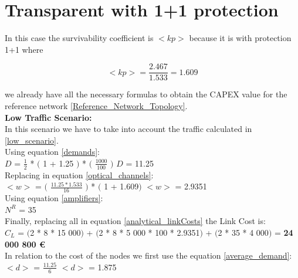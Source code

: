 \clearpage

\section{Transparent with 1+1 protection}\label{analytical_Transp_Protection}

In this case the survivability coefficient is $<kp>$ because it is with protection 1+1 where

\begin{equation*}
<kp> = \frac{2.467}{1.533} = 1.609
\end{equation*}

\noindent
we already have all the necessary formulas to obtain the CAPEX value for the reference network \ref{Reference_Network_Topology}.\\

\textbf{Low Traffic Scenario:}\\

In this scenario we have to take into account the traffic calculated in \ref{low_scenario}.\\

Using equation \ref{demands}:\\

$D$ = $\frac{1}{2}$ * $($ 1 + 1.25 $)$ * $($ $\frac{1000}{100}$ $)$ \qquad \qquad $D$ = 11.25\\

Replacing in equation \ref{optical_channels}:\\

$<w>$ = $($ $\frac{11.25 * 1.533}{16}$ $)$ * $($ 1 + 1.609$)$ \qquad \qquad $<w>$ = 2.9351\\

Using equation \ref{amplifiers}:\\

$N^R$ = 35\\

Finally, replacing all in equation \ref{analytical_linkCosts} the Link Cost is:\\

$C_L$ = $($2 * 8 * 15 000$)$ + $($2 * 8 * 5 000 * 100 * 2.9351$)$ + $($2 * 35 * 4 000$)$ = \textbf{24 000 800 \euro}\\

In relation to the cost of the nodes we first use the equation \ref{average_demand}:\\

$<d>$ = $\frac{11.25}{6}$ \qquad \qquad $<d>$ = 1.875\\

